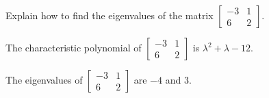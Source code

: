 
\begin{exerciseStatement}


Explain how to find the eigenvalues of the matrix \( \left[\begin{array}{cc}
-3 & 1 \\
6 & 2
\end{array}\right] \).


\end{exerciseStatement}
    
\begin{exerciseAnswer} 


The characteristic polynomial of \( \left[\begin{array}{cc}
-3 & 1 \\
6 & 2
\end{array}\right] \) is \( \lambda^{2} + \lambda - 12 \).



The eigenvalues of \( \left[\begin{array}{cc}
-3 & 1 \\
6 & 2
\end{array}\right] \) are \( -4 \) and \( 3 \).


\end{exerciseAnswer}
    
